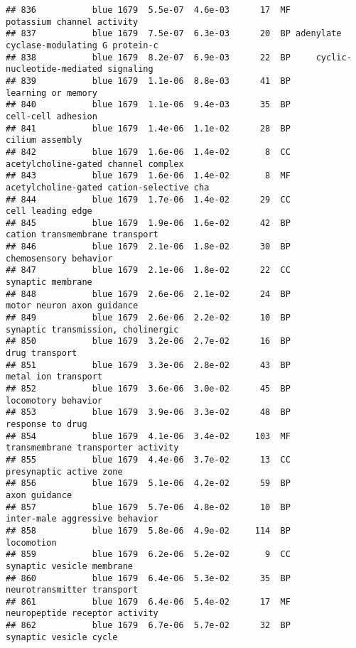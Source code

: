 \documentclass[]{article}
\begin{document}
\begin{verbatim}
## 836           blue 1679  5.5e-07  4.6e-03      17  MF               potassium channel activity
## 837           blue 1679  7.5e-07  6.3e-03      20  BP adenylate cyclase-modulating G protein-c
## 838           blue 1679  8.2e-07  6.9e-03      22  BP     cyclic-nucleotide-mediated signaling
## 839           blue 1679  1.1e-06  8.8e-03      41  BP                       learning or memory
## 840           blue 1679  1.1e-06  9.4e-03      35  BP                       cell-cell adhesion
## 841           blue 1679  1.4e-06  1.1e-02      28  BP                          cilium assembly
## 842           blue 1679  1.6e-06  1.4e-02       8  CC      acetylcholine-gated channel complex
## 843           blue 1679  1.6e-06  1.4e-02       8  MF acetylcholine-gated cation-selective cha
## 844           blue 1679  1.7e-06  1.4e-02      29  CC                        cell leading edge
## 845           blue 1679  1.9e-06  1.6e-02      42  BP           cation transmembrane transport
## 846           blue 1679  2.1e-06  1.8e-02      30  BP                    chemosensory behavior
## 847           blue 1679  2.1e-06  1.8e-02      22  CC                        synaptic membrane
## 848           blue 1679  2.6e-06  2.1e-02      24  BP               motor neuron axon guidance
## 849           blue 1679  2.6e-06  2.2e-02      10  BP       synaptic transmission, cholinergic
## 850           blue 1679  3.2e-06  2.7e-02      16  BP                           drug transport
## 851           blue 1679  3.3e-06  2.8e-02      43  BP                      metal ion transport
## 852           blue 1679  3.6e-06  3.0e-02      45  BP                      locomotory behavior
## 853           blue 1679  3.9e-06  3.3e-02      48  BP                         response to drug
## 854           blue 1679  4.1e-06  3.4e-02     103  MF       transmembrane transporter activity
## 855           blue 1679  4.4e-06  3.7e-02      13  CC                  presynaptic active zone
## 856           blue 1679  5.1e-06  4.2e-02      59  BP                            axon guidance
## 857           blue 1679  5.7e-06  4.8e-02      10  BP           inter-male aggressive behavior
## 858           blue 1679  5.8e-06  4.9e-02     114  BP                               locomotion
## 859           blue 1679  6.2e-06  5.2e-02       9  CC                synaptic vesicle membrane
## 860           blue 1679  6.4e-06  5.3e-02      35  BP               neurotransmitter transport
## 861           blue 1679  6.4e-06  5.4e-02      17  MF           neuropeptide receptor activity
## 862           blue 1679  6.7e-06  5.7e-02      32  BP                   synaptic vesicle cycle

\end{verbatim}
\end{document}
